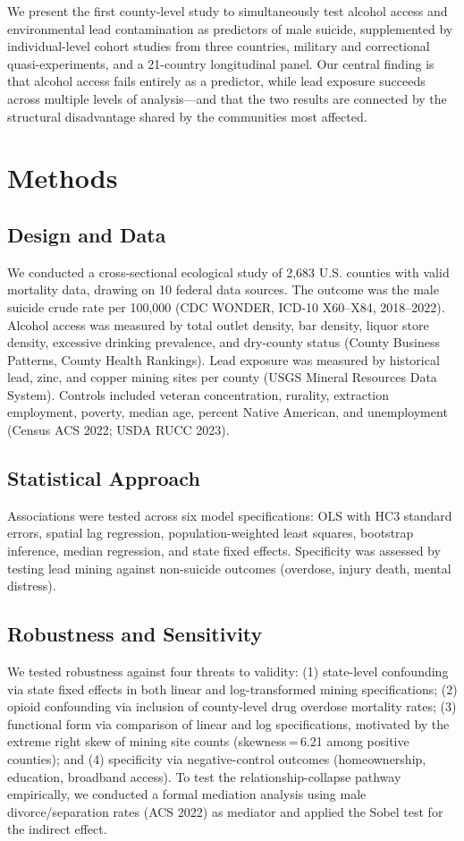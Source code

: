 \documentclass[11pt,twocolumn]{article}
\begin{document}
We present the first county-level study to simultaneously test alcohol access and environmental lead contamination as predictors of male suicide, supplemented by individual-level cohort studies from three countries, military and correctional quasi-experiments, and a 21-country longitudinal panel. Our central finding is that alcohol access fails entirely as a predictor, while lead exposure succeeds across multiple levels of analysis---and that the two results are connected by the structural disadvantage shared by the communities most affected.


\section{Methods}

\subsection{Design and Data}
We conducted a cross-sectional ecological study of 2,683 U.S. counties with valid mortality data, drawing on 10 federal data sources. The outcome was the male suicide crude rate per 100,000 (CDC WONDER, ICD-10 X60--X84, 2018--2022). Alcohol access was measured by total outlet density, bar density, liquor store density, excessive drinking prevalence, and dry-county status (County Business Patterns, County Health Rankings). Lead exposure was measured by historical lead, zinc, and copper mining sites per county (USGS Mineral Resources Data System). Controls included veteran concentration, rurality, extraction employment, poverty, median age, percent Native American, and unemployment (Census ACS 2022; USDA RUCC 2023).

\subsection{Statistical Approach}
Associations were tested across six model specifications: OLS with HC3 standard errors, spatial lag regression, population-weighted least squares, bootstrap inference, median regression, and state fixed effects. Specificity was assessed by testing lead mining against non-suicide outcomes (overdose, injury death, mental distress).

\subsection{Robustness and Sensitivity}
We tested robustness against four threats to validity: (1) state-level confounding via state fixed effects in both linear and log-transformed mining specifications; (2) opioid confounding via inclusion of county-level drug overdose mortality rates; (3) functional form via comparison of linear and log specifications, motivated by the extreme right skew of mining site counts (skewness\,=\,6.21 among positive counties); and (4) specificity via negative-control outcomes (homeownership, education, broadband access). To test the relationship-collapse pathway empirically, we conducted a formal mediation analysis using male divorce/separation rates (ACS 2022) as mediator and applied the Sobel test for the indirect effect.
\end{document}
